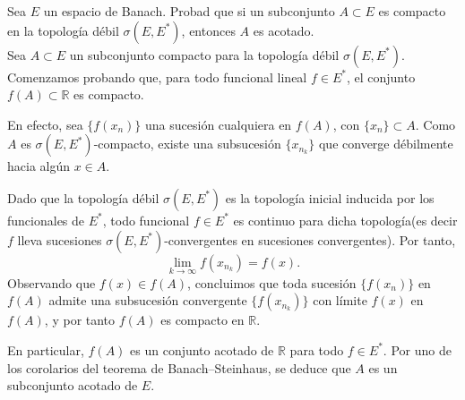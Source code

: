 \documentclass[12pt]{article}
\begin{document}
    
    \begin{ejercicio}[2.5 puntos]
        Sea $E$ un espacio de Banach. Probad que si un subconjunto $A\subset E$ es compacto en la topología débil $\sigma(E,E^\ast)$, entonces $A$ es acotado.\\

    Sea $A\subset E$ un subconjunto compacto para la topología débil $\sigma(E,E^\ast)$.\\
    Comenzamos probando que, para todo funcional lineal $f\in E^\ast$, el conjunto $f(A)\subset\mathbb{R}$ es compacto.
    
    En efecto, sea $\{f(x_n)\}$ una sucesión cualquiera en $f(A)$, con $\{x_n\}\subset A$.
    Como $A$ es $\sigma(E,E^\ast)$-compacto, existe una subsucesión $\{x_{n_k}\}$ que converge débilmente hacia algún $x\in A$.
    
    Dado que la topología débil $\sigma(E,E^\ast)$ es la topología inicial inducida por los funcionales de $E^\ast$, todo funcional $f\in E^\ast$ es continuo para dicha topología(es decir $f$ lleva sucesiones $\sigma(E,E^\ast)$-convergentes en sucesiones convergentes).
    Por tanto,
    \begin{equation*}
        \lim_{k\to\infty} f(x_{n_k}) = f(x).
    \end{equation*}
    Observando que $f(x)\in f(A)$, concluimos que toda sucesión $\{f(x_n)\}$ en $f(A)$ admite una subsucesión convergente $\{f(x_{n_k})\}$ con límite $f(x)$ en $f(A)$, y por tanto $f(A)$ es compacto en $\mathbb{R}$.
    
    En particular, $f(A)$ es un conjunto acotado de $\mathbb{R}$ para todo $f\in E^\ast$.
    Por uno de los corolarios del teorema de Banach--Steinhaus, se deduce que $A$ es un subconjunto acotado de $E$.

    \end{ejercicio}
    \newpage
\end{document}
